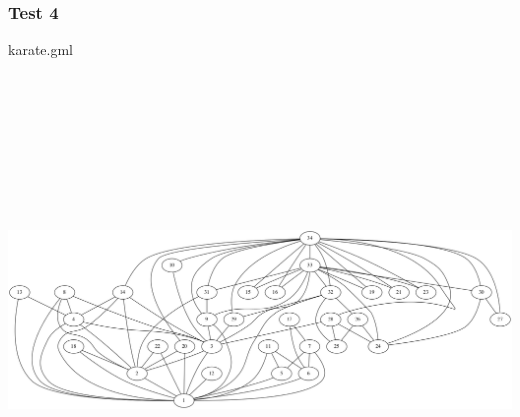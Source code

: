 \documentclass[a4paper]{report}
\begin{document}
\begin{landscape}
\subsubsection{Test 4}
karate.gml\cite{TESTBENCH21}
\begin{center}
 \includegraphics[width=200mm, height=130mm, scale=0.1]{karate}
 \end{center}
\end{landscape}
\nocite{*}


\end{document}
